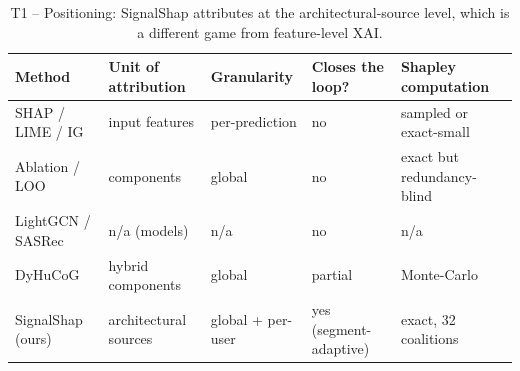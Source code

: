 \begin{table}[htbp]
\centering
\footnotesize
\caption{T1 -- Positioning: SignalShap attributes at the architectural-source level, which is a different game from feature-level XAI.}
\label{tab:T1_positioning}
\begin{tabular}{lllll}
\toprule
Method & Unit of attribution & Granularity & Closes the loop? & Shapley computation \\
\midrule
SHAP / LIME / IG & input features & per-prediction & no & sampled or exact-small \\
Ablation / LOO & components & global & no & exact but redundancy-blind \\
LightGCN / SASRec & n/a (models) & n/a & no & n/a \\
DyHuCoG & hybrid components & global & partial & Monte-Carlo \\
SignalShap (ours) & architectural sources & global + per-user & yes (segment-adaptive) & exact, 32 coalitions \\
\bottomrule
\end{tabular}
\end{table}
